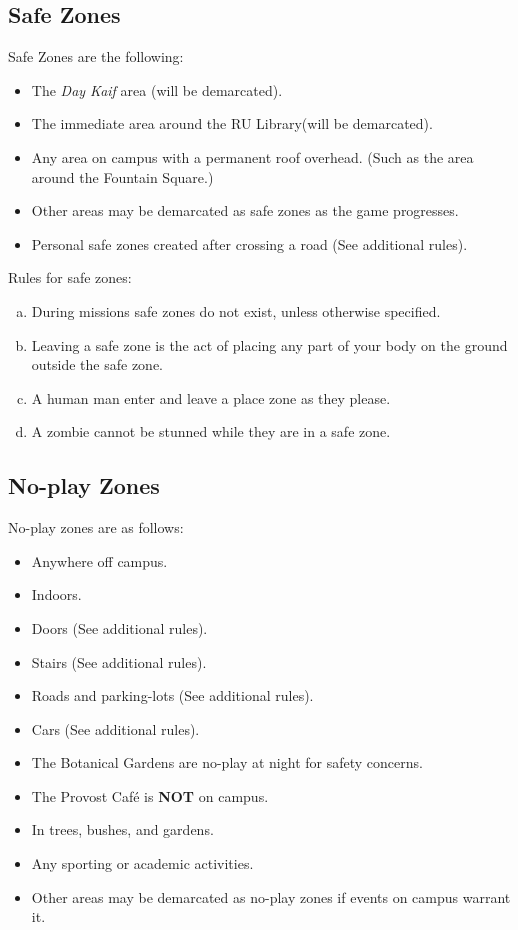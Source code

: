 \documentclass[a4paper,12pt]{article}
\begin{document}
\subsection{Safe Zones}
Safe Zones are the following:
\begin{itemize}
    \item The \emph{Day Kaif} area (will be demarcated).
    \item The immediate area around the RU Library(will be demarcated).
    \item Any area on campus with a permanent roof overhead. (Such as the area around the Fountain Square.)
    \item Other areas may be demarcated as safe zones as the game progresses.
    \item Personal safe zones created after crossing a road (See additional rules).
\end{itemize}

Rules for safe zones:
\begin{enumerate}[(a)]
    \item During missions safe zones do not exist, unless otherwise specified.
    \item Leaving a safe zone is the act of placing any part of your body on the ground outside the safe zone.
    \item A human man enter and leave a place zone as they please.
    \item A zombie cannot be stunned while they are in a safe zone.
\end{enumerate}

\subsection{No-play Zones}
No-play zones are as follows:
\begin{itemize}
    \item Anywhere off campus.
    \item Indoors.
    \item Doors (See additional rules).
    \item Stairs (See additional rules).
    \item Roads and parking-lots (See additional rules).
    \item Cars (See additional rules).
    \item The Botanical Gardens are no-play at night for safety concerns.
    \item The Provost Caf\'e is {\bf NOT} on campus. 
    \item In trees, bushes, and gardens.
    \item Any sporting or academic activities.
    \item Other areas may be demarcated as no-play zones if events on campus warrant it.
\end{itemize}
\end{document}
